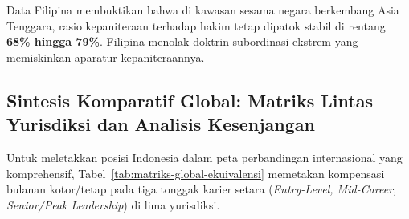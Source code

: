 \documentclass[12pt, a4paper]{article}
\begin{document}
Data Filipina membuktikan bahwa di kawasan sesama negara berkembang Asia Tenggara, rasio kepaniteraan terhadap hakim tetap dipatok stabil di rentang \textbf{68\% hingga 79\%}. Filipina menolak doktrin subordinasi ekstrem yang memiskinkan aparatur kepaniteraannya.

\subsection{Sintesis Komparatif Global: Matriks Lintas Yurisdiksi dan Analisis Kesenjangan}

Untuk meletakkan posisi Indonesia dalam peta perbandingan internasional yang komprehensif, Tabel~\ref{tab:matriks-global-ekuivalensi} memetakan kompensasi bulanan kotor/tetap pada tiga tonggak karier setara (\textit{Entry-Level, Mid-Career, Senior/Peak Leadership}) di lima yurisdiksi.
\end{document}
